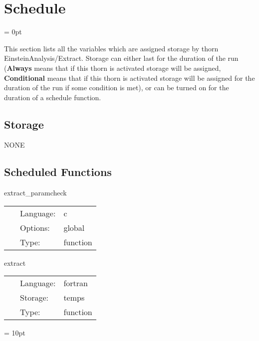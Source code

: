 
\section{Schedule} 


\parskip = 0pt


\noindent This section lists all the variables which are assigned storage by thorn EinsteinAnalysis/Extract.  Storage can either last for the duration of the run ({\bf Always} means that if this thorn is activated storage will be assigned, {\bf Conditional} means that if this thorn is activated storage will be assigned for the duration of the run if some condition is met), or can be turned on for the duration of a schedule function.


\subsection*{Storage}NONE
\subsection*{Scheduled Functions}
\vspace{5mm}


\hspace{5mm} extract\_paramcheck 

\hspace{5mm}{\it check parameters } 


\hspace{5mm}

 \begin{tabular*}{160mm}{cll} 
~ & Language:  & c \\ 
~ & Options:  & global \\ 
~ & Type:  & function \\ 
\end{tabular*} 


\vspace{5mm}


\hspace{5mm} extract 

\hspace{5mm}{\it extract waveforms } 


\hspace{5mm}

 \begin{tabular*}{160mm}{cll} 
~ & Language:  & fortran \\ 
~ & Storage:  & temps \\ 
~ & Type:  & function \\ 
\end{tabular*} 



\vspace{5mm}\parskip = 10pt 
